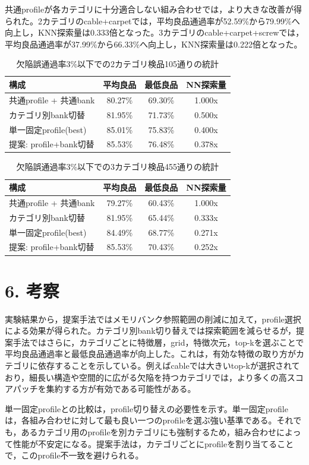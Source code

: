 \documentclass[a4paper,twocolumn,10pt]{ltjsarticle}
\begin{document}
共通profileが各カテゴリに十分適合しない組み合わせでは，より大きな改善が得られた。2カテゴリのcable+carpetでは，平均良品通過率が52.59\%から79.99\%へ向上し，KNN探索量は0.333倍となった。3カテゴリのcable+carpet+screwでは，平均良品通過率が37.99\%から66.33\%へ向上し，KNN探索量は0.222倍となった。

\begin{table}[h]\centering\small
\caption{欠陥誤通過率3\%以下での2カテゴリ検品105通りの統計}
\begin{tabular}{lccc}\toprule 構成 & 平均良品 & 最低良品 & NN探索量\\\midrule
共通profile + 共通bank & 80.27\% & 69.30\% & 1.000x\\
カテゴリ別bank切替 & 81.95\% & 71.73\% & 0.500x\\
単一固定profile(best) & 85.01\% & 75.83\% & 0.400x\\
提案: profile+bank切替 & 85.53\% & 76.48\% & 0.378x\\
\bottomrule\end{tabular}\end{table}
\begin{table}[h]\centering\small
\caption{欠陥誤通過率3\%以下での3カテゴリ検品455通りの統計}
\begin{tabular}{lccc}\toprule 構成 & 平均良品 & 最低良品 & NN探索量\\\midrule
共通profile + 共通bank & 79.27\% & 60.43\% & 1.000x\\
カテゴリ別bank切替 & 81.95\% & 65.44\% & 0.333x\\
単一固定profile(best) & 84.49\% & 68.77\% & 0.271x\\
提案: profile+bank切替 & 85.53\% & 70.43\% & 0.252x\\
\bottomrule\end{tabular}\end{table}
\section*{6. 考察}
実験結果から，提案手法ではメモリバンク参照範囲の削減に加えて，profile選択による効果が得られた。カテゴリ別bank切り替えでは探索範囲を減らせるが，提案手法ではさらに，カテゴリごとに特徴層，grid，特徴次元，top-kを選ぶことで平均良品通過率と最低良品通過率が向上した。これは，有効な特徴の取り方がカテゴリに依存することを示している。例えばcableでは大きいtop-kが選択されており，細長い構造や空間的に広がる欠陥を持つカテゴリでは，より多くの高スコアパッチを集約する方が有効である可能性がある。

単一固定profileとの比較は，profile切り替えの必要性を示す。単一固定profileは，各組み合わせに対して最も良い一つのprofileを選ぶ強い基準である。それでも，あるカテゴリ用のprofileを別カテゴリにも強制するため，組み合わせによって性能が不安定になる。提案手法は，カテゴリごとにprofileを割り当てることで，このprofile不一致を避けられる。
\end{document}
